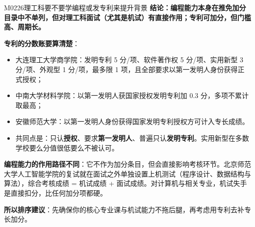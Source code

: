 \begin{qa}{M0226}{理工科要不要学编程或发专利来提升背景}
\textbf{结论：编程能力本身在推免加分目录中不单列，但对理工科面试（尤其是机试）有直接作用；专利可加分，但门槛高、周期长。}

\textbf{专利的分数账要算清楚}：
\begin{itemize}
  \item 大连理工大学商学院：发明专利 5 分/项、软件著作权 5 分/项、实用新型 3 分/项、外观型 1 分/项，最多限 1 项，且全部要求以第一发明人身份获得正式授权；
  \item 中南大学材料学院：以第一发明人获国家授权发明专利加 0.3 分，多项不累计取最高；
  \item 安徽师范大学：以第一发明人身份获得国家发明专利授权方可计入专长成绩。
  \item 共同点是：只认\textbf{授权}、要求\textbf{第一发明人}、普遍只认\textbf{发明专利}。实用新型在多数学校要么分值很低要么不被认可。
\end{itemize}

\textbf{编程能力的作用路径不同}：它不作为加分条目，但会直接影响考核环节。北京师范大学人工智能学院的复试就在面试之外单独设置上机测试（程序设计、数据结构与算法），综合考核成绩 = 机试成绩 + 面试成绩。对计算机与相关专业，机试失手是直接扣分，比任何加分项都硬。

\textbf{所以排序建议}：先确保你的核心专业课与机试能力不拖后腿，再考虑用专利去补专长加分。
\end{qa}

